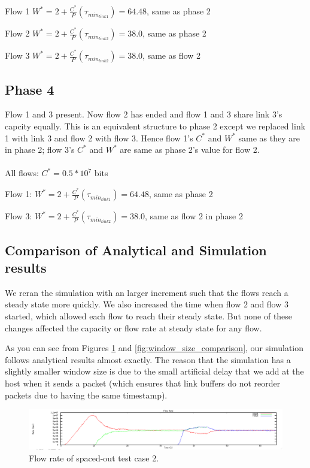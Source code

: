 \documentclass[12pt]{article}
\begin{document}
Flow 1 $W^* = 2+\frac{C^*}{P}(\tau_{min_{link1}}) = 64.48$, same as phase 2

Flow 2 $W^* = 2+\frac{C^*}{P}(\tau_{min_{link2}}) = 38.0$, same as phase 2

Flow 3 $W^* = 2+\frac{C^*}{P}(\tau_{min_{link2}}) = 38.0$, same as flow 2

\subsection*{Phase 4}
Flow 1 and 3 present.
Now flow 2 has ended and flow 1 and 3 share link 3's capcity equally. This is an equivalent structure to phase 2 except we replaced link 1 with link 3 and flow 2 with flow 3. Hence flow 1's $C^*$ and $W^*$ same as they are in phase 2; flow 3's $C^*$ and $W^*$ are same as phase 2's value for flow 2.
\\\\
All flows: $C^* = 0.5*10^7$ bits

Flow 1: $W^* = 2+\frac{C^*}{P}(\tau_{min_{link1}}) = 64.48$, same as phase 2

Flow 3: $W^* = 2+\frac{C^*}{P}(\tau_{min_{link2}}) = 38.0$, same as flow 2 in phase 2


\subsection{Comparison of Analytical and Simulation results}
We reran the simulation with an larger increment such that the flows reach a steady state more quickly. We also increased the time when flow 2 and flow 3 started, which allowed each flow to reach their steady state. But none of these changes affected the capacity or flow rate at steady state for any flow.

As you can see from Figures \ref{fig:flow_rate_comparison} and \ref{fig:window_size_comparison}, our simulation follows analytical results almost exactly. The reason that the simulation has a slightly smaller window size is due to the small artificial delay that we add at the host when it sends a packet (which ensures that link buffers do not reorder packets due to having the same timestamp).

\begin{figure}[!ht]
\centering \includegraphics[bb= 0 0 1300 250, scale=.35]{figures/flow_rate_comparison.png}
\caption{Flow rate of spaced-out test case 2.}
\label{fig:flow_rate_comparison}
\end{figure}
\end{document}
